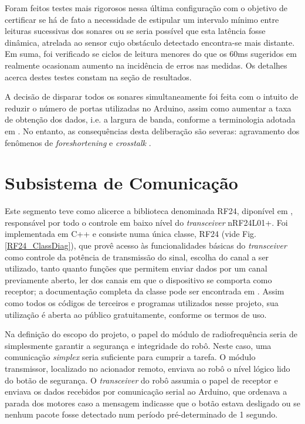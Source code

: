 Foram feitos testes mais rigorosos nessa última configuração com o objetivo de certificar se há de fato a necessidade de estipular um intervalo 
mínimo entre leituras sucessivas dos sonares ou se seria possível que esta latência fosse dinâmica, atrelada ao sensor cujo obstáculo detectado 
encontra-se mais distante.
Em suma, foi verificado se ciclos de leitura menores do que os 60ms sugeridos em \cite{HC-SR04} realmente ocasionam aumento na incidência de erros 
nas medidas. Os detalhes acerca destes testes constam na seção de resultados.

A decisão de disparar todos os sonares simultaneamente foi feita com o intuito de reduzir o número de portas utilizadas no Arduino, assim como 
aumentar a taxa de obtenção dos dados, i.e. a largura de banda, conforme a terminologia adotada  em \cite{roseli}.
No entanto, as consequências desta deliberação são  severas: agravamento dos fenômenos de \textit{foreshortening} e \textit{crosstalk} 
\cite{2016_artigo_5}. %

\section{Subsistema de Comunicação}
Este segmento teve como alicerce a biblioteca denominada RF24, diponível em \cite{nrf_lib}, responsável por todo o controle em baixo nível do 
\textit{transceiver} nRF24L01+.
Foi implementada em C++ e consiste numa única classe, RF24 (vide Fig.\ref{RF24_ClassDiag}), que provê acesso às funcionalidades básicas do 
\textit{transceiver} como controle da potência de transmissão do sinal, escolha do canal a ser utilizado, tanto quanto funções que permitem enviar 
dados por um canal previamente aberto, ler dos canais em que o dispositivo se comporta como receptor; a documentação completa da classe pode ser 
encontrada em \cite{RF24_class_doc}.
Assim como todos os códigos de terceiros e programas utilizados nesse projeto, sua utilização é aberta ao público gratuitamente, conforme os termos 
de uso.

Na definição do escopo do projeto, o papel do módulo de radiofrequência seria de simplesmente garantir a segurança e integridade do robô.
Neste caso, uma comunicação \textit{simplex} seria suficiente para cumprir a tarefa.
O módulo transmissor, localizado no acionador remoto, enviava ao robô o nível lógico lido do botão de segurança.
O \textit{transceiver} do robô assumia o papel de receptor e enviava os dados recebidos por comunicação serial ao Arduino, que ordenava a parada dos 
motores caso a mensagem indicasse que o botão estava desligado ou se nenhum pacote fosse detectado num período pré-determinado de 1 segundo.

